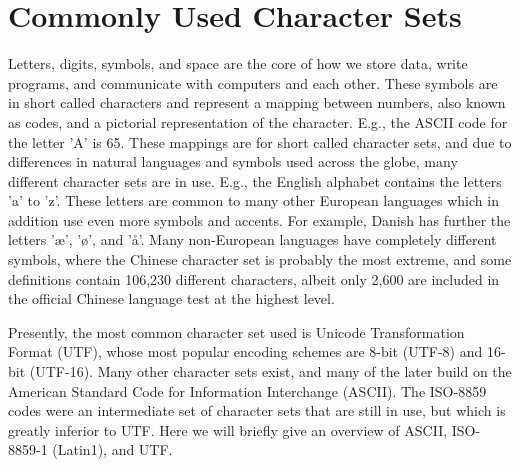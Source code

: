 \documentclass[fsharpnotes.tex]{subfiles}
\begin{document}
\chapter{Commonly Used Character Sets}
\label{sec:characterSets}
Letters, digits, symbols, and space are the core of how we store data, write programs, and communicate with computers and each other. These symbols are in short called characters and represent a mapping between numbers, also known as codes, and a pictorial representation of the character. E.g., the ASCII code for the letter 'A' is 65. These mappings are for short called character sets, and due to differences in natural languages and symbols used across the globe, many different character sets are in use. E.g., the English alphabet contains the letters 'a' to 'z'. These letters are common to many other European languages which in addition use even more symbols and accents. For example, Danish has further the letters 'æ', 'ø', and 'å'. Many non-European languages have completely different symbols, where the Chinese character set is probably the most extreme, and some definitions contain 106,230 different characters, albeit only 2,600 are included in the official Chinese language test at the highest level.

Presently, the most common character set used is Unicode Transformation Format (UTF), whose most popular encoding schemes are 8-bit (UTF-8) and 16-bit (UTF-16). Many other character sets exist, and many of the later build on the American Standard Code for Information Interchange (ASCII). The ISO-8859 codes were an intermediate set of character sets that are still in use, but which is greatly inferior to UTF. Here we will briefly give an overview of ASCII, ISO-8859-1 (Latin1), and UTF.
\end{document}
